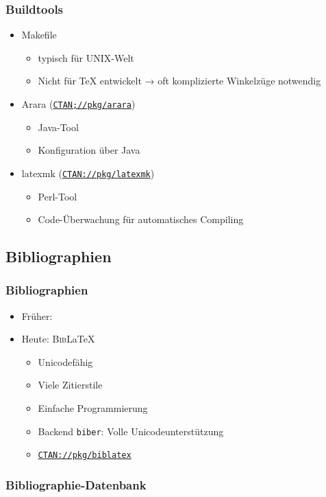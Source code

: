\begin{frame}
  \frametitle{Buildtools}
  \begin{itemize}
  \item Makefile
    \begin{itemize}
    \item typisch für UNIX-Welt
    \item Nicht für \TeX{} entwickelt → oft komplizierte Winkelzüge notwendig
    \end{itemize}
  \item Arara
    (\href{http://ctan.org/pkg/arara}{\texttt{CTAN;//pkg/arara}})
    \begin{itemize}
    \item Java-Tool
    \item Konfiguration über Java
    \end{itemize}
  \item latexmk
    (\href{http://ctan.org/pkg/latexmk}{\texttt{CTAN://pkg/latexmk}})
    \begin{itemize}
    \item Perl-Tool
    \item Code-Überwachung für automatisches Compiling
    \end{itemize}
  \end{itemize}
\end{frame}

\subsection{Bibliographien}
\begin{frame}
  \frametitle{Bibliographien}
  \begin{itemize}
  \item Früher: 
  \item Heute: \alert{\textsc{Bib}\LaTeX}
    \begin{itemize}
    \item Unicodefähig
    \item Viele Zitierstile
    \item Einfache Programmierung
    \item Backend \texttt{biber}: Volle Unicodeunterstützung
    \item \href{http://ctan.org/pkg/biblatex}{\texttt{CTAN://pkg/biblatex}}
    \end{itemize}
  \end{itemize}
\end{frame}

\begin{frame}[fragile]
  \frametitle{Bibliographie-Datenbank}
  
  \begingroup
  \printbibliography[heading=none,keyword=bibexample]
  \endgroup
\end{frame}

